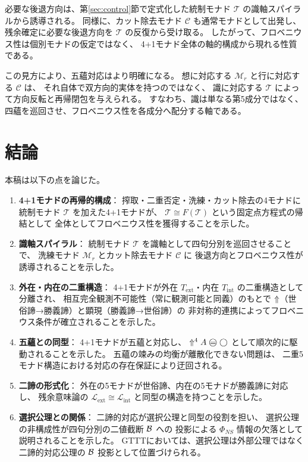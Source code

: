 \documentclass[11pt,a4paper]{article}
\newcommand{\Mr}{\mathcal{M}_r}
\newcommand{\MC}{\mathcal{C}}
\newcommand{\MT}{\mathcal{T}}
\newcommand{\Text}{T_{\mathrm{ext}}}
\newcommand{\Tint}{T_{\mathrm{int}}}
\newcommand{\Lhagma}{\mathcal{L}}
\newcommand{\lext}{\Lhagma_{\mathrm{ext}}}
\newcommand{\lint}{\Lhagma_{\mathrm{int}}}
\theoremstyle{definition}
\begin{document}
必要な後退方向は、第\ref{sec:control}節で定式化した統制モナド $\MT$ の識軸スパイラルから誘導される。
同様に、カット除去モナド $\MC$ も通常モナドとして出発し、
残余確定に必要な後退方向を $\MT$ の反復から受け取る。
したがって、フロベニウス性は個別モナドの仮定ではなく、
4+1モナド全体の軸的構成から現れる性質である。

この見方により、五蘊対応はより明確になる。
想に対応する $\Mr$ と行に対応する $\MC$ は、
それ自体で双方向的実体を持つのではなく、
識に対応する $\MT$ によって方向反転と再帰閉包を与えられる。
すなわち、識は単なる第5成分ではなく、
四蘊を巡回させ、フロベニウス性を各成分へ配分する軸である。

\section{結論}

本稿は以下の点を論じた。

\begin{enumerate}
  \item \textbf{4+1モナドの再帰的構成}：
    搾取・二重否定・洗練・カット除去の4モナドに
    統制モナド $\MT$ を加えた4+1モナドが、
    $\MT \cong F(\MT)$ という固定点方程式の帰結として
    全体としてフロベニウス性を獲得することを示した。

  \item \textbf{識軸スパイラル}：
    統制モナド $\MT$ を識軸として四句分別を巡回させることで、
    洗練モナド $\Mr$ とカット除去モナド $\MC$ に
    後退方向とフロベニウス性が誘導されることを示した。

  \item \textbf{外在・内在の二重構造}：
    4+1モナドが外在 $\Text$・内在 $\Tint$ の二重構造として分離され、
    相互完全観測不可能性（常に観測可能と同義）のもとで
    $\Uparrow$（世俗諦→勝義諦）と顕現（勝義諦→世俗諦）の
    非対称的連携によってフロベニウス条件が確立されることを示した。

  \item \textbf{五蘊との同型}：
    4+1モナドが五蘊と対応し、
    $\metanegation^4 A \mweq \dfix$ として順次的に駆動されることを示した。
    五蘊の竦みの均衡が離散化できない問題は、
    二重5モナド構造における対応の存在保証により迂回される。

  \item \textbf{二諦の形式化}：
    外在の5モナドが世俗諦、内在の5モナドが勝義諦に対応し、
    残余意味論の $\lext \cong \lint$ と同型の構造を持つことを示した。

  \item \textbf{選択公理との関係}：
    二諦的対応が選択公理と同型の役割を担い、
    選択公理の非構成性が四句分別の二値截断 $\mathcal{B}$ への
    投影による $\Phi_{NS}$ 情報の欠落として説明されることを示した。
    GTTTにおいては、選択公理は外部公理ではなく
    二諦的対応公理の $\mathcal{B}$ 投影として位置づけられる。
\end{enumerate}
\end{document}
